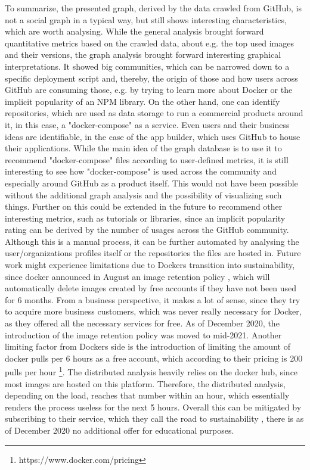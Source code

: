 To summarize, the presented graph, derived by the data crawled from GitHub, is not a social graph in a typical way, but still shows interesting characteristics, which are worth analysing. While the general analysis brought forward quantitative metrics based on the crawled data, about e.g. the top used images and their versions, the graph analysis brought forward interesting graphical interpretations. It showed big communities, which can be narrowed down to a specific deployment script and, thereby, the origin of those and how users across GitHub are consuming those, e.g. by trying to learn more about Docker or the implicit popularity of an NPM library. On the other hand, one can identify repositories, which are used as data storage to run a commercial products around it, in this case, a "docker-compose" as a service. Even users and their business ideas are identifiable, in the case of the app builder, which uses GitHub to house their applications. While the main idea of the graph database is to use it to recommend "docker-compose" files according to user-defined metrics, it is still interesting to see how "docker-compose" is used across the community and especially around GitHub as a product itself. This would not have been possible without the additional graph analysis and the possibility of visualizing such things. Further on this could be extended in the future to recommend other interesting metrics, such as tutorials or libraries, since an implicit popularity rating can be derived by the number of usages across the GitHub community. Although this is a manual process, it can be further automated by analysing the user/organizations profiles itself or the repositories the files are hosted in.
Future work might experience limitations due to Dockers transition into sustainability, since docker announced in August an image retention policy , which will automatically delete images created by free accounts if they have not been used for 6 months. From a business perspective, it makes a lot of sense, since they try to acquire more business customers, which was never really necessary for Docker, as they offered all the necessary services for free. As of December 2020, the introduction of the image retention policy was moved to mid-2021. Another limiting factor from Dockers side is the introduction of limiting the amount of docker pulls per 6 hours as a free account, which according to their pricing is 200 pulls per hour \footnote{https://www.docker.com/pricing}. The distributed analysis heavily relies on the docker hub, since most images are hosted on this platform. Therefore, the distributed analysis, depending on the load, reaches that number within an hour, which essentially renders the process useless for the next 5 hours. Overall this can be mitigated by subscribing to their service, which they call the road to sustainability , there is as of December 2020 no additional offer for educational purposes.
